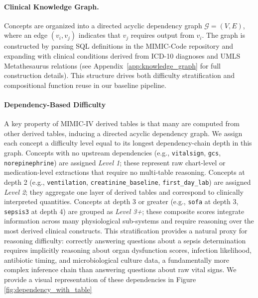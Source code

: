 \paragraph{Clinical Knowledge Graph.}
Concepts are organized into a directed acyclic dependency graph $\mathcal{G} = (V, E)$, where an edge $(v_i, v_j)$ indicates that $v_j$ requires output from $v_i$. The graph is constructed by parsing SQL definitions in the MIMIC-Code repository and expanding with clinical conditions derived from ICD-10 diagnoses and UMLS Metathesaurus relations (see Appendix~\ref{app:knowledge_graph} for full construction details). This structure drives both difficulty stratification and compositional function reuse in our baseline pipeline.
\paragraph{Dependency-Based Difficulty} A key property of MIMIC-IV derived tables is that many are computed from other derived tables, inducing a directed acyclic dependency graph. We assign each concept a difficulty level equal to its longest dependency-chain depth in this graph. Concepts with no upstream dependencies (e.g., \texttt{vitalsign}, \texttt{gcs}, \texttt{norepinephrine}) are assigned \textit{Level 1}; these represent raw chart-level or medication-level extractions that require no multi-table reasoning. Concepts at depth 2 (e.g., \texttt{ventilation}, \texttt{creatinine\_baseline}, \texttt{first\_day\_lab}) are assigned \textit{Level 2}; they aggregate one layer of derived tables and correspond to clinically interpreted quantities. Concepts at depth 3 or greater (e.g., \texttt{sofa} at depth 3, \texttt{sepsis3} at depth 4) are grouped as \textit{Level 3+}; these composite scores integrate information across many physiological sub-systems and require reasoning over the most derived clinical constructs. This stratification provides a natural proxy for reasoning difficulty: correctly answering questions about a sepsis determination requires implicitly reasoning about organ dysfunction scores, infection likelihood, antibiotic timing, and microbiological culture data, a fundamentally more complex inference chain than answering questions about raw vital signs. We provide a visual representation of these dependencies in Figure \ref{fig:dependency_with_table}

